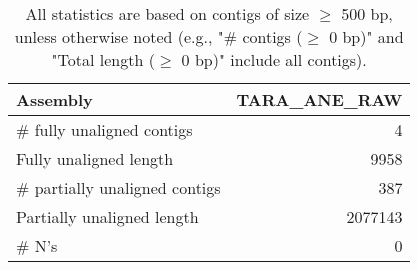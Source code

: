 \documentclass[12pt,a4paper]{article}
\begin{document}
\begin{table}[ht]
\begin{center}
\caption{All statistics are based on contigs of size $\geq$ 500 bp, unless otherwise noted (e.g., "\# contigs ($\geq$ 0 bp)" and "Total length ($\geq$ 0 bp)" include all contigs).}
\begin{tabular}{|l*{1}{|r}|}
\hline
Assembly & TARA\_ANE\_RAW \\ \hline
\# fully unaligned contigs & 4 \\ \hline
Fully unaligned length & 9958 \\ \hline
\# partially unaligned contigs & 387 \\ \hline
Partially unaligned length & 2077143 \\ \hline
\# N's & 0 \\ \hline
\end{tabular}
\end{center}
\end{table}
\end{document}
